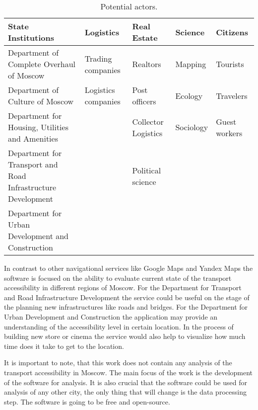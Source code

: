 \begin{table}[ht]
  \renewcommand{\arraystretch}{1.5}
  \centering
  \footnotesize
  \begin{tabular}{p{4cm} p{2.5cm} p{2.5cm} p{1.5cm} p{2.2cm}}
    \hline
    \textbf{State Institutions} & \textbf{Logistics} &\textbf{Real Estate}
    & \textbf{Science} & \textbf{Citizens} \\
    \hline

    Department of Complete Overhaul of Moscow &
    Trading companies &
    Realtors &
    Mapping &
    Tourists \\


    Department of Culture of Moscow &
    Logistics companies &
    Post officers &
    Ecology &
    Travelers  \\


    Department for Housing, Utilities and Amenities &
    &
    Collector Logistics &
    Sociology &
    Guest workers \\


    Department for Transport and Road Infrastructure Development
    &
    &
    Political science &
    \\


    Department for Urban Development and Construction &
    &
    &
    &
    \\

    \hline
  \end{tabular}

  \caption{Potential actors.}
  \label{tab:actors}
\end{table}

In contrast to other navigational services like Google Maps and Yandex Maps the software is
focused on the ability to evaluate current state of the transport accessibility in different regions
of Moscow. For the Department for Transport and Road Infrastructure Development the service could be
useful on the stage of the planning new infrastructures like roads and bridges. For the Department for
Urban Development and Construction the application may provide an understanding of the
accessibility level in certain location. In the process of building new store or cinema the service
would also help to visualize how much time does it take to get to the location.

It is important to note, that this work does not contain any analysis of the transport accessibility
in Moscow. The main focus of the work is the development of the software for analysis. It is also
crucial that the software could be used for analysis of any other city, the only
thing that will change is the data processing step. The software is going to be free and
open-source.

